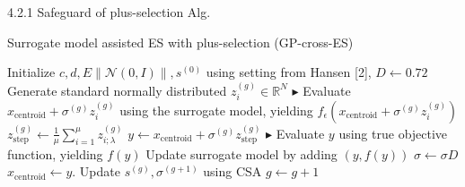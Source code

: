 \documentclass{beamer}
\begin{document}
\begin{frame}{4.2.1 Safeguard of plus-selection Alg.}
\begin{block}{Surrogate model assisted ES with plus-selection (GP-cross-ES)}
 \footnotesize{
    \begin{algorithm}[H]
    \begin{algorithmic}[1]
        \STATE Initialize $c,d,E \left\lVert \mathcal{N}(0,I) \right\rVert,s^{(0)}$  using setting from Hansen [2], $D \leftarrow 0.72$
    		\STATE Generate standard normally distributed $z_i^{(g)} \in \mathbb{R}^N $ 
    		\hfill$\blacktriangleright$ %
    		\STATE Evaluate $x_{\text{centroid}}+ \sigma^{(g)} z_i^{(g)}$ using the surrogate model, yielding $f_{\epsilon}(x_{\text{centroid}} + \sigma^{(g)} z_i^{(g)})$
    	\ENDFOR
    	\STATE $z_{\text{step}}^{(g)} \leftarrow \frac{1}{\mu}\sum_{i=1}^{\mu} z_{i;\lambda}^{(g)}$   
    	\hfill {} %
    	\STATE $y  \leftarrow  x_{\text{centroid}} + \sigma^{(g)} z_{\text{step}}^{(g)}$ 
    	\hfill$\blacktriangleright$ %
    	\STATE Evaluate $y$ using true objective function, yielding $f(y)$
    	\STATE Update surrogate model by adding $(y,f(y))$
    		\STATE $\sigma \leftarrow \sigma D$
    		\hfill{} %
    	\ELSE
    		\STATE $ x_{\text{centroid}} \leftarrow y $. Update $s^{(g)},\sigma^{(g+1)}$ using CSA \hfill{} %
    	\ENDIF
    	\STATE $g \leftarrow g + 1$
    \ENDWHILE
    \end{algorithmic}
    \end{algorithm}
}
\end{block}
\end{frame}
\end{document}
